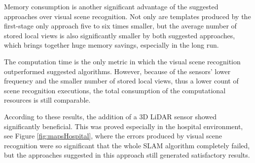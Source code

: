 Memory consumption is another significant advantage of the suggested approaches over visual scene recognition. Not only are templates produced by the first-stage only approach five to six times smaller, but the average number of stored local views is also significantly smaller by both suggested approaches, which brings together huge memory savings, especially in the long run.\par
The computation time is the only metric in which the visual scene recognition outperformed suggested algorithms. However, because of the sensors' lower frequency and the smaller number of stored local views, thus a lower count of scene recognition executions, the total consumption of the computational resources is still comparable.\par
According to these results, the addition of a 3D LiDAR sensor showed significantly beneficial. This was proved especially in the hospital environment, see Figure \ref{fig:mapsHospital}, where the errors produced by visual scene recognition were so significant that the whole SLAM algorithm completely failed, but the approaches suggested in this approach still generated satisfactory results.
